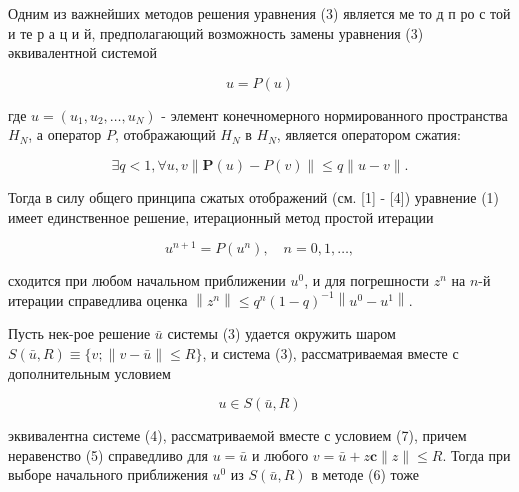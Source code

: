 \documentclass[10pt]{article}
\begin{document}
Одним из важнейших методов решения уравнения (3) является ме то д п ро с той и те р а ц и й, предполагающий возможность замены уравнения (3) әквивалентной системой



\[

u=P(u)

\]



где $u=\left(u_{1}, u_{2}, \ldots, u_{N}\right)$ - элемент конечномерного нормированного пространства $H_{N}$, а оператор $P$, отображающий $H_{N}$ в $H_{N}$, является оператором сжатия:



\[

\exists q<1, \forall u, v\|\boldsymbol{P}(u)-P(v)\| \leqslant q\|u-v\| .

\]



Тогда в силу общего принципа сжатых отображений (см. [1] - [4]) уравнение (1) имеет единственное решение, итерационный метод простой итерации



\[

u^{n+1}=P\left(u^{n}\right), \quad n=0,1, \ldots,

\]



сходится при любом начальном приближении $u^{0}$, и для погрешности $z^{n}$ на $n$-й итерации справедлива оценка $\left\|z^{n}\right\| \leqslant q^{n}(1-q)^{-1}\left\|u^{0}-u^{1}\right\|$.



Пусть нек-рое решение $\bar{u}$ системы (3) удается окружить шаром $S(\bar{u}, R) \equiv\{v ;\|v-\bar{u}\| \leqslant R\}$, и система (3), рассматриваемая вместе с дополнительным условием



\[

u \in S(\bar{u}, R)

\]



эквивалентна системе (4), рассматриваемой вместе с условием (7), причем неравенство (5) справедливо для $u=\bar{u}$ и любого $v=\bar{u}+z \mathbf{c}\|z\| \leqslant R$. Тогда при выборе начального приближения $u^{0}$ из $S(\bar{u}, R)$ в методе (6) тоже
\end{document}
